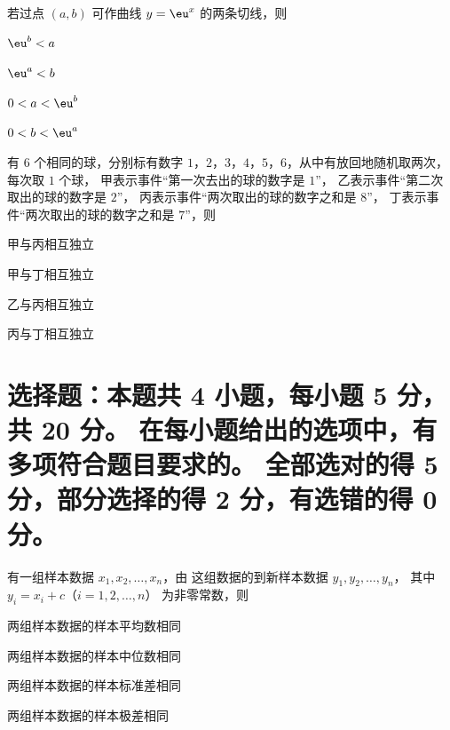 \documentclass{exam-zh}
\begin{document}
\begin{question}
  若过点 $(a, b)$ 可作曲线 $y = \eu^x$ 的两条切线，则 \paren
  \begin{choices}
    \item $\eu^b < a$
    \item $\eu^a < b$
    \item $0 < a < \eu^b$
    \item $0 < b < \eu^a$
  \end{choices}
\end{question}

\begin{question}
  有 $6$ 个相同的球，分别标有数字 $1$，$2$，$3$，$4$，$5$，$6$，从中有放回地随机取两次，每次取 $1$ 个球，
  甲表示事件“第一次去出的球的数字是 $1$”，
  乙表示事件“第二次取出的球的数字是 $2$”，
  丙表示事件“两次取出的球的数字之和是 $8$”，
  丁表示事件“两次取出的球的数字之和是 $7$”，则 \paren
  \begin{choices}
    \item 甲与丙相互独立
    \item 甲与丁相互独立
    \item 乙与丙相互独立
    \item 丙与丁相互独立
  \end{choices}
\end{question}



\section{%
  选择题：本题共 4 小题，每小题 5 分，共 20 分。
  在每小题给出的选项中，有多项符合题目要求的。
  全部选对的得 5 分，部分选择的得 2 分，有选错的得 0 分。
}

\begin{question}
  有一组样本数据 $x_1, x_2, \dots, x_n$，由 这组数据的到新样本数据 $y_1, y_2, \dots, y_n$，
  其中 $y_i = x_i + c$（$i = 1, 2, \dots, n$） 为非零常数，则 \paren
  \begin{choices}
    \item 两组样本数据的样本平均数相同
    \item 两组样本数据的样本中位数相同
    \item 两组样本数据的样本标准差相同
    \item 两组样本数据的样本极差相同
  \end{choices}
\end{question}
\end{document}
